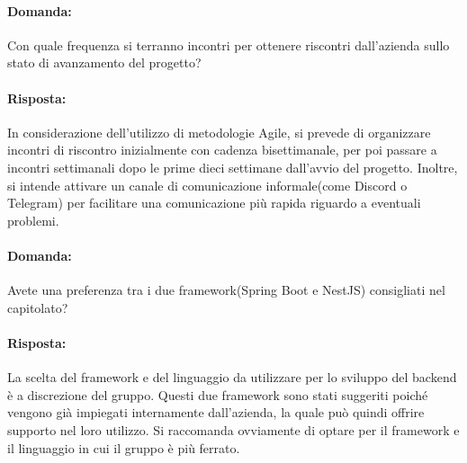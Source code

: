 \documentclass[a4paper, 12pt]{article}
\begin{document}
\vspace{1.2cm}

\paragraph{Domanda:} Con quale frequenza si terranno incontri per ottenere riscontri dall'azienda sullo stato di avanzamento del progetto?
\paragraph{Risposta:} In considerazione dell'utilizzo di metodologie Agile, si prevede di organizzare incontri di riscontro inizialmente con cadenza bisettimanale, per poi passare a incontri settimanali dopo le prime dieci settimane dall'avvio del progetto. Inoltre, si intende attivare un canale di comunicazione informale(come Discord o Telegram) per facilitare una comunicazione più rapida riguardo a eventuali problemi.

\vspace{1.2cm}

\paragraph{Domanda:} Avete una preferenza tra i due framework(Spring Boot e NestJS) consigliati nel capitolato?
\paragraph{Risposta:} La scelta del framework e del linguaggio da utilizzare per lo sviluppo del backend è a discrezione del gruppo. Questi due framework sono stati suggeriti poiché vengono già impiegati internamente dall'azienda, la quale può quindi offrire supporto nel loro utilizzo. Si raccomanda ovviamente di optare per il framework e il linguaggio in cui il gruppo è più ferrato.
\end{document}
